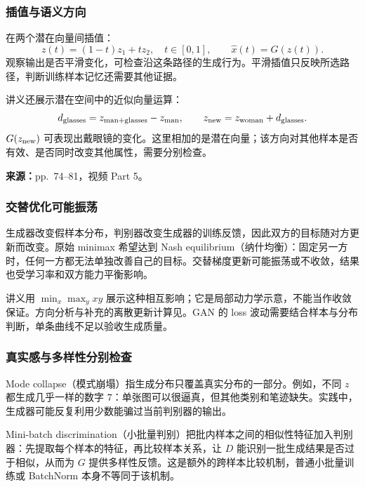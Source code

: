 \subsubsection{插值与语义方向}

在两个潜在向量间插值：
\[
 z(t)=(1-t)z_1+tz_2,\quad t\in[0,1],
 \qquad \hat x(t)=G(z(t)).
\]
观察输出是否平滑变化，可检查沿这条路径的生成行为。平滑插值只反映所选路径，判断训练样本记忆还需要其他证据。

讲义还展示潜在空间中的近似向量运算：
\[
 d_{\rm glasses}=z_{\rm man+glasses}-z_{\rm man},\qquad
 z_{\rm new}=z_{\rm woman}+d_{\rm glasses}.
\]
$G(z_{\rm new})$ 可表现出戴眼镜的变化。这里相加的是潜在向量；该方向对其他样本是否有效、是否同时改变其他属性，需要分别检查。


\textbf{来源：}pp.~74--81，视频 Part 5。

\subsubsection{交替优化可能振荡}

生成器改变假样本分布，判别器改变生成器的训练反馈，因此双方的目标随对方更新而改变。原始 minimax 希望达到 Nash equilibrium（纳什均衡）：固定另一方时，任何一方都无法单独改善自己的目标。交替梯度更新可能振荡或不收敛，结果也受学习率和双方能力平衡影响。

讲义用 $\min_x\max_y xy$ 展示这种相互影响；它是局部动力学示意，不能当作收敛保证。方向分析与补充的离散更新计算见。GAN 的 loss 波动需要结合样本与分布判断，单条曲线不足以验收生成质量。

\subsubsection{真实感与多样性分别检查}

Mode collapse（模式崩塌）指生成分布只覆盖真实分布的一部分。例如，不同 $z$ 都生成几乎一样的数字 $7$：单张图可以很逼真，但其他类别和笔迹缺失。实践中，生成器可能反复利用少数能骗过当前判别器的输出。

Mini-batch discrimination（小批量判别）把批内样本之间的相似性特征加入判别器：先提取每个样本的特征，再比较样本关系，让 $D$ 能识别一批生成结果是否过于相似，从而为 $G$ 提供多样性反馈。这是额外的跨样本比较机制，普通小批量训练或 BatchNorm 本身不等同于该机制。



